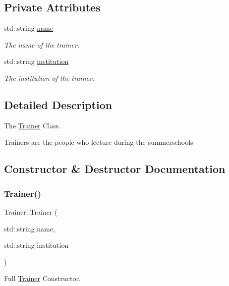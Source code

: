\subsection*{Private Attributes}
\begin{DoxyCompactItemize}
\item 
std\+::string \hyperlink{classTrainer_a6b58d4cfdb8d3482cb2c09dd366a6350}{name}
\begin{DoxyCompactList}\small\item\em The name of the trainer. \end{DoxyCompactList}\item 
std\+::string \hyperlink{classTrainer_ae895aa7f146d8bf271399215d4ede36b}{institution}
\begin{DoxyCompactList}\small\item\em The institution of the trainer. \end{DoxyCompactList}\end{DoxyCompactItemize}


\subsection{Detailed Description}
The \hyperlink{classTrainer}{Trainer} Class. 

Trainers are the people who lecture during the summerschools 

\subsection{Constructor \& Destructor Documentation}
\mbox{\label{classTrainer_ae033382eaedd47966c8667439376369a}} 
\subsubsection{\texorpdfstring{Trainer()}{Trainer()}}
{\footnotesize\ttfamily Trainer\+::\+Trainer (\begin{DoxyParamCaption}\item[{std\+::string}]{name,  }\item[{std\+::string}]{institution }\end{DoxyParamCaption})\hspace{0.3cm}{\ttfamily [inline]}}



Full \hyperlink{classTrainer}{Trainer} Constructor. 


